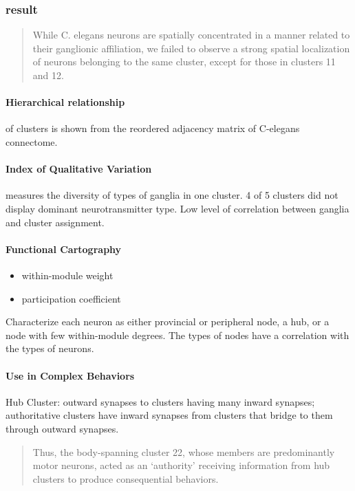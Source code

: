 \subsubsection{result}
\begin{quote}{While C. elegans
neurons are spatially concentrated in a manner related to their
ganglionic affiliation, we failed to observe a strong spatial
localization of neurons belonging to the same cluster, except for
those in clusters 11 and 12.}
\end{quote}

\paragraph{Hierarchical relationship}
of clusters is shown from the reordered adjacency matrix of C-elegans connectome.

\paragraph{Index of Qualitative Variation} measures the diversity of types of ganglia in one cluster. 4 of 5 clusters did not display dominant neurotransmitter type.
Low level of correlation between ganglia and cluster assignment.

\paragraph{Functional Cartography}
\begin{itemize}
  \item within-module weight
  \item participation coefficient
\end{itemize}
Characterize each neuron as either provincial or peripheral node, a hub, or a node with few within-module degrees. The types of nodes have a correlation with the types
of neurons.

\paragraph{Use in Complex Behaviors}
Hub Cluster: outward synapses to clusters having many inward synapses;
authoritative clusters have inward synapses from clusters that bridge to them through outward synapses.

\begin{quote}{Thus, the body-spanning cluster 22, whose members are
predominantly motor neurons, acted as an ‘authority’ receiving
information from hub clusters to produce consequential behaviors.}
\end{quote}

